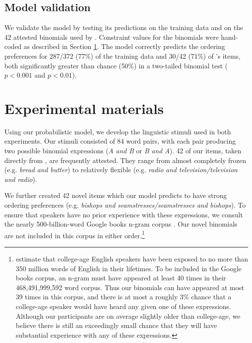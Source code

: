 \documentclass[authoryear]{elsarticle}
\begin{document}
\subsection{Model validation}\label{validation}
We validate the model by testing its predictions on the training data and on the 42 attested binomials used by \citet{SiyanovaChanturia:2011ep}. Constraint values for the \citeauthor{SiyanovaChanturia:2011ep} binomials were hand-coded as described in Section \ref{materials}. The model correctly predicts the ordering preferences for 287/372 (77\%) of the training data and 30/42 (71\%) of \citeauthor{SiyanovaChanturia:2011ep}'s items, both significantly greater than chance (50\%) in a two-tailed binomial test ($p < 0.001$ and $p < 0.01$).


\section{Experimental materials}\label{materials}
Using our probabilistic model, we develop the linguistic stimuli used in both experiments. Our stimuli consisted of 84 word pairs, with each pair producing two possible binomial expressions (\emph{A and B} or \emph{B and A}). 42 of our items, taken directly from \citet{SiyanovaChanturia:2011ep}, are frequently attested. They range from almost completely frozen (e.g. \emph{bread and butter}) to relatively flexible (e.g. \emph{radio and television/television and radio}).

We further created 42 novel items which our model predicts to have strong ordering preferences (e.g. \emph{bishops and seamstresses/seamstresses and bishops}). To ensure that speakers have no prior experience with these expressions, we consult the nearly 500-billion-word Google books n-gram corpus \citep{Lin:2012te}. Our novel binomials are not included in this corpus in either order.\footnote{\citet{Levy:2012bj} estimate that college-age English speakers have been exposed to no more than 350 million words of English in their lifetimes. To be included in the Google books corpus, an n-gram must have appeared at least 40 times in their 468,491,999,592 word corpus. Thus our binomials can have appeared at most 39 times in this corpus, and there is at most a roughly 3\% chance that a college-age speaker would have heard any given one of these expressions. Although our participants are on average slightly older than college-age, we believe there is still an exceedingly small chance that they will have substantial experience with any of these expressions.} 
\end{document}
